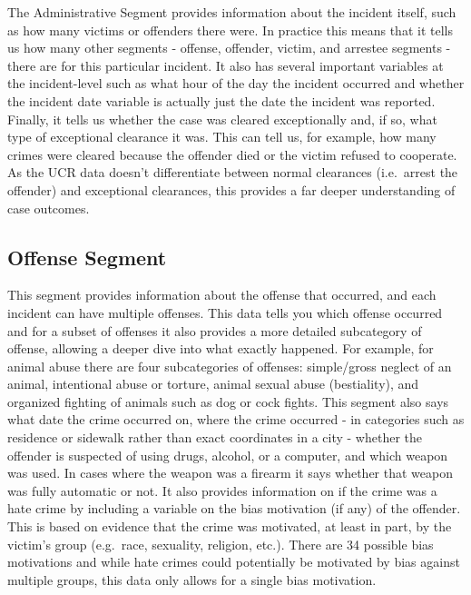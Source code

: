 \documentclass[
  12pt,
  openany]{book}
\begin{document}
The Administrative Segment provides information about the incident itself, such as how many victims or offenders there were. In practice this means that it tells us how many other segments - offense, offender, victim, and arrestee segments - there are for this particular incident. It also has several important variables at the incident-level such as what hour of the day the incident occurred and whether the incident date variable is actually just the date the incident was reported. Finally, it tells us whether the case was cleared exceptionally and, if so, what type of exceptional clearance it was. This can tell us, for example, how many crimes were cleared because the offender died or the victim refused to cooperate. As the UCR data doesn't differentiate between normal clearances (i.e.~arrest the offender) and exceptional clearances, this provides a far deeper understanding of case outcomes.

\hypertarget{offense-segment}{%
\subsection{Offense Segment}\label{offense-segment}}

This segment provides information about the offense that occurred, and each incident can have multiple offenses. This data tells you which offense occurred and for a subset of offenses it also provides a more detailed subcategory of offense, allowing a deeper dive into what exactly happened. For example, for animal abuse there are four subcategories of offenses: simple/gross neglect of an animal, intentional abuse or torture, animal sexual abuse (bestiality), and organized fighting of animals such as dog or cock fights. This segment also says what date the crime occurred on, where the crime occurred - in categories such as residence or sidewalk rather than exact coordinates in a city - whether the offender is suspected of using drugs, alcohol, or a computer, and which weapon was used. In cases where the weapon was a firearm it says whether that weapon was fully automatic or not. It also provides information on if the crime was a hate crime by including a variable on the bias motivation (if any) of the offender. This is based on evidence that the crime was motivated, at least in part, by the victim's group (e.g.~race, sexuality, religion, etc.). There are 34 possible bias motivations and while hate crimes could potentially be motivated by bias against multiple groups, this data only allows for a single bias motivation.
\end{document}
